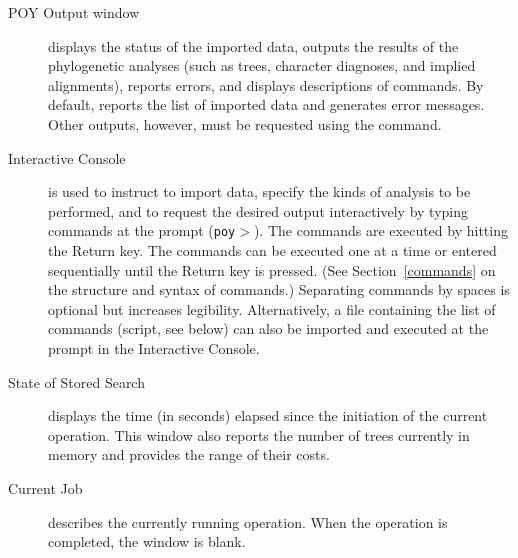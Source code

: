 \begin{description}
\item[POY Output window] displays the status of the imported data, outputs the results of the phylogenetic analyses (such as trees, character diagnoses, and implied alignments), reports errors, and displays descriptions of \poy commands. By default, \poy reports the list of imported data and generates error messages. Other outputs, however, must be requested using the  command.
\item[Interactive Console]  is used to instruct \poy to import data, specify the kinds of analysis to be performed, and to request the desired output interactively by typing \poy commands at the \poy prompt (\texttt{poy$>$}). The commands are executed by hitting the Return key. The commands can be executed one at a time or entered sequentially until the Return key is pressed. (See Section~\ref{commands} on the structure and syntax of \poy commands.) Separating commands by spaces is optional but increases legibility. Alternatively, a file containing the list of commands (\poy script, see below) can also be imported and executed at the prompt in the Interactive Console.
\item[State of Stored Search]  displays the time (in seconds) elapsed since the initiation of the current operation. This window also reports the number of trees currently in memory and provides the range of their costs.
\item[Current Job] describes the currently running operation. When the operation is completed, the window is blank.
\end{description} 

